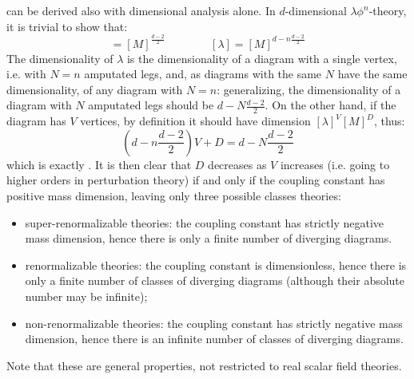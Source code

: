  can be derived also with dimensional analysis alone. In $ d $-dimensional $ \lambda \phi^n $-theory, it is trivial to show that:
\begin{equation*}
  [\phi] = [M]^{\frac{d - 2}{2}}
  \qquad \qquad
  [\lambda] = [M]^{d - n \frac{d - 2}{2}}
\end{equation*}
The dimensionality of $ \lambda $ is the dimensionality of a diagram with a single vertex, i.e. with $ N = n $ amputated legs, and, as diagrams with the same $ N $ have the same dimensionality, of any diagram with $ N = n $: generalizing, the dimensionality of a diagram with $ N $ amputated legs should be $ d - N \frac{d - 2}{2} $. On the other hand, if the diagram has $ V $ vertices, by definition it should have dimension $ [\lambda]^V [M]^D $, thus:
\begin{equation*}
  \left( d - n \frac{d - 2}{2} \right) V + D = d - N \frac{d - 2}{2}
\end{equation*}
which is exactly . It is then clear that $ D $ decreases as $ V $ increases (i.e. going to higher orders in perturbation theory) if and only if the coupling constant has positive mass dimension, leaving only three possible classes theories:
\begin{itemize}
  \item super-renormalizable theories: the coupling constant has strictly negative mass dimension, hence there is only a finite number of diverging diagrams.
  \item renormalizable theories: the coupling constant is dimensionless, hence there is only a finite number of classes of diverging diagrams (although their absolute number may be infinite);
  \item non-renormalizable theories: the coupling constant has strictly negative mass dimension, hence there is an infinite number of classes of diverging diagrams.
\end{itemize}
Note that these are general properties, not restricted to real scalar field theories.

